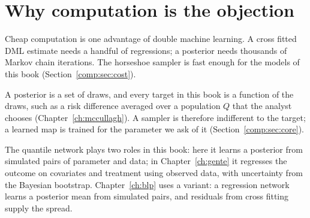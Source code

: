 \section{Why computation is the objection}\label{comp:sec:why}

Cheap computation is one advantage of double machine learning. A cross fitted DML estimate needs a handful of regressions; a posterior needs thousands of Markov chain iterations. The horseshoe sampler is fast enough for the models of this book (Section~\ref{comp:sec:cost}).

A posterior is a set of draws, and every target in this book is a function of the draws, such as a risk difference averaged over a population $Q$ that the analyst chooses (Chapter~\ref{ch:mccullagh}). A sampler is therefore indifferent to the target; a learned map is trained for the parameter we ask of it (Section~\ref{comp:sec:core}).



The quantile network plays two roles in this book: here it learns a posterior from simulated pairs of parameter and data; in Chapter~\ref{ch:gente} it regresses the outcome on covariates and treatment using observed data, with uncertainty from the Bayesian bootstrap. Chapter~\ref{ch:blp} uses a variant: a regression network learns a posterior mean from simulated pairs, and residuals from cross fitting supply the spread.
